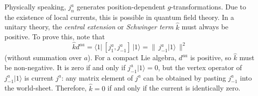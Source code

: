 Physically speaking, $j_{n}^{a}$ generates position-dependent $g$-transformations. Due to the existence of local currents, this is possible in quantum field theory. In a unitary theory, the \emph{central extension} or \emph{Schwinger term} $\hat{k}$ must always be positive. To prove this, note that
\begin{equation}
	\hat{k}d^{aa}= \langle 1\rvert\,[j_{1}^{a},j_{-1}^{a}]\,\lvert 1 \rangle = \lVert\,j_{-1}^{a}\lvert1\rangle\,\rVert^{2}  \label{11.5.9}
\end{equation}
(without summation over $a$). For a compact Lie algebra, $d^{aa}$ is positive, so $\hat{k}$ must be non-negative. It is zero if and only if $j_{-1}^{a}\lvert1\rangle=0$, but the vertex operator of $j_{-1}^{a}\lvert1\rangle$ is current $j^{a}$: any matrix element of $j^{a}$ can be obtained by pasting $j_{-1}^{a}$ into the world-sheet. Therefore, $\hat{k}=0$ if and only if the current is identically zero.

